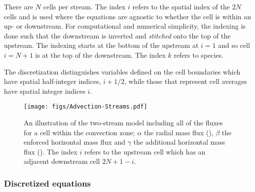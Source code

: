 \documentclass[fleqn,usenatbib]{mnras}
\begin{document}
There are $N$ cells per stream. The index $i$ refers to the spatial index of the
$2N$ cells and is used where the equations are agnostic to whether the cell is
within an up- or downstream. For computational and numerical simplicity, the
indexing is done such that the downstream is inverted and \textit{stitched} onto
the top of the upstream. The indexing starts at the bottom of the upstream at
$i=1$ and so cell $i=N+1$ is at the top of the downstream. The index $k$ refers
to species.

The discretization distinguishes variables defined on the cell boundaries which
have spatial half-integer indices, $i+1/2$, while those that represent cell
averages have spatial integer indices $i$.

\begin{figure}

  \texttt{[image: figs/Advection-Streams.pdf]}
  \centering
  \caption{An illustration of the two-stream model including all of the fluxes
          for a cell within the convection zone; $\alpha$ the radial mass flux
          (), $\beta$ the enforced horizontal mass flux and $\gamma$
          the additional horizontal mass flux (). The index $i$
          refers to the upstream cell which has an adjacent downstream cell $2N + 1 - i$.}
  \label{fig:elevator}

\end{figure}

\subsubsection{Discretized equations}
\label{sec:discretized}
\end{document}

